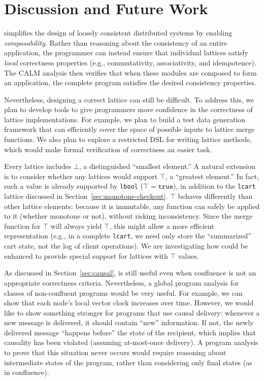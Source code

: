 \section{Discussion and Future Work}
\label{sec:discussion}

\lang simplifies the design of loosely consistent distributed systems by
enabling \emph{composability}. Rather than reasoning about the consistency of an
entire application, the programmer can instead ensure that individual lattices
satisfy \emph{local} correctness properties (e.g., commutativity, associativity,
and idempotence). The CALM analysis then verifies that when these modules are
composed to form an application, the complete program satisfies the desired
consistency properties.

Nevertheless, designing a correct lattice can still be difficult. To address
this, we plan to develop tools to give programmers more confidence in the
correctness of lattice implementations. For example, we plan to build a test
data generation framework that can efficiently cover the space of possible
inputs to lattice merge functions. We also plan to explore a restricted DSL for
writing lattice methods, which would make formal verification of correctness an
easier task.

Every lattice includes $\bot$, a distinguished ``smallest element.'' A natural
extension is to consider whether any lattices would support $\top$, a ``greatest
element.'' In fact, such a value is already supported by \texttt{lbool} ($\top =
\mathtt{true}$), in addition to the \texttt{lcart} lattice discussed in
Section~\ref{sec:monotone-checkout}. $\top$ behaves differently than other
lattice elements: because it is immutable, any function can safely be applied to
it (whether monotone or not), without risking inconsistency. Since the merge
function for $\top$ will always yield $\top$, this might allow a more efficient
representation (e.g., in a complete \texttt{lcart}, we need only store the
``summarized'' cart state, not the log of client operations). We are
investigating how \lang could be enhanced to provide special support for
lattices with $\top$ values.

As discussed in Section~\ref{sec:causal}, \lang is still useful even when
confluence is not an appropriate correctness criteria. Nevertheless, a global
program analysis for classes of non-confluent programs would be very useful. For
example, we can show that each node's local vector clock increases over
time. However, we would like to show something stronger for programs that use
causal delivery: whenever a new message is delivered, it should contain ``new''
information. If not, the newly delivered message ``happens before'' the state of
the recipient, which implies that causality has been violated (assuming
at-most-once delivery). A program analysis to prove that this situation never
occurs would require reasoning about intermediate states of the program, rather
than considering only final states (as in confluence).

